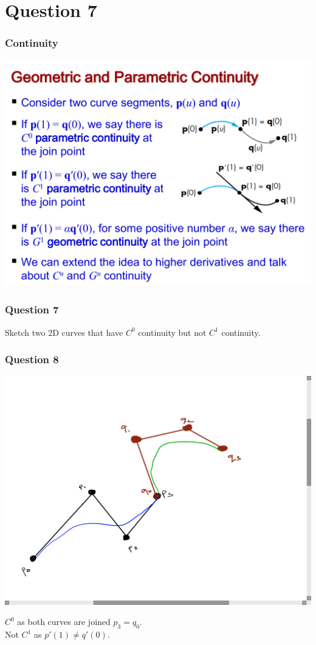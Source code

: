 \documentclass{beamer}
\begin{document}
\section{Question 7}

\begin{frame}
    \frametitle{Continuity}

    \centering
    \includegraphics[scale=0.3]{continuity.png}

\end{frame}

\begin{frame}
    \frametitle{Question 7}
    Sketch two 2D curves that have $C^0$ continuity but not $C^1$ continuity.
\end{frame}

\begin{frame}
    \frametitle{Question 8}

    \centering
    \includegraphics[scale=0.2]{q7.png}
    \vspace{1em}

    $C^0$ as both curves are joined $p_3 = q_0$.\\
    Not $C^1$ as $p'(1) \neq q'(0)$.

\end{frame}
\end{document}
